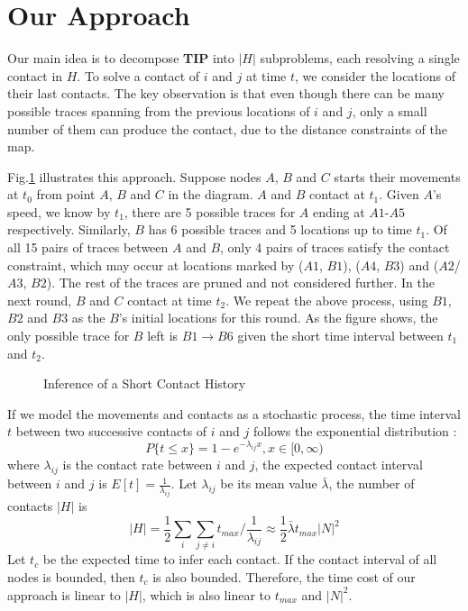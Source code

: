 \section{Our Approach}
\label{sec:approach}
Our main idea is to decompose \textbf{TIP} into $|H|$ subproblems,
each resolving a single contact in $H$.
To solve a contact of $i$ and $j$ at time $t$, we consider the locations
of their last contacts. The key observation is that even though
there can be many possible traces spanning from the previous locations
of $i$ and $j$, only a small number of them can produce the contact,
due to the distance constraints of the map.

Fig.\ref{fig:des} illustrates this approach.
Suppose nodes $A$, $B$ and $C$ starts their movements at $t_0$ from point $A$, $B$ and $C$
in the diagram. $A$ and $B$ contact at $t_1$. Given $A$'s speed, we know by $t_1$, there are
5 possible traces for $A$ ending at $A1$-$A5$ respectively. Similarly, $B$ has 6 possible traces
and 5 locations up to time $t_1$. Of all 15 pairs of traces between $A$ and $B$, only 4
pairs of traces satisfy the contact constraint, which may occur at locations marked by ($A1$, $B1$),
($A4$, $B3$) and ($A2$/$A3$, $B2$). The rest of the traces are pruned and not considered further.
In the next round, $B$ and $C$ contact at time $t_2$. We repeat the above process,
using $B1$, $B2$ and $B3$ as the $B$'s initial locations for this round. As the figure shows,
the only possible trace for $B$ left is $B1 \rightarrow B6$ given the short time interval between $t_1$ and
$t_2$.

\begin{figure}[th]
\centering
{}
\caption{Inference of a Short Contact History}
\label{fig:des}
\end{figure}

If we model the movements and contacts as a stochastic process,
the time interval $t$ between two successive contacts of $i$ and $j$ 
follows the exponential distribution \cite{Gao11:DTN}: 
\[P\{t\leq x\}=1-e^{-\lambda_{ij} x}, x\in[0,\infty)\]
where $\lambda_{ij}$ is the contact rate between $i$ and $j$, 
the expected contact interval between $i$ and $j$
is $E[t]=\frac{1}{\lambda_{ij}}$. Let $\lambda_{ij}$ be its 
mean value $\bar{\lambda}$, the number of contacts $|H|$ is
\begin{equation*}
|H| =  \frac{1}{2}\sum_i\sum_{j\not=i} t_{max}/\frac{1}{\lambda_{ij}}
\approx\frac{1}{2}\bar{\lambda} t_{max}|N|^2
\label{equ:complexity}
\end{equation*}
Let $t_{c}$ be the expected time to infer each contact.
If the contact interval of all nodes is bounded, then $t_{c}$
is also bounded. Therefore, the time cost of our
approach is linear to $|H|$, which is also linear to
$t_{max}$ and $|N|^2$. 




